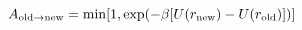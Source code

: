 \documentclass[12pt]{article}
\begin{document}
\begin{displaymath}
A_{\rm old \rightarrow new}  = 
\min[1, { \exp(-\beta [U(r_{\rm new}) - U(r_{\rm old})])}]
\end{displaymath}
\end{document}
